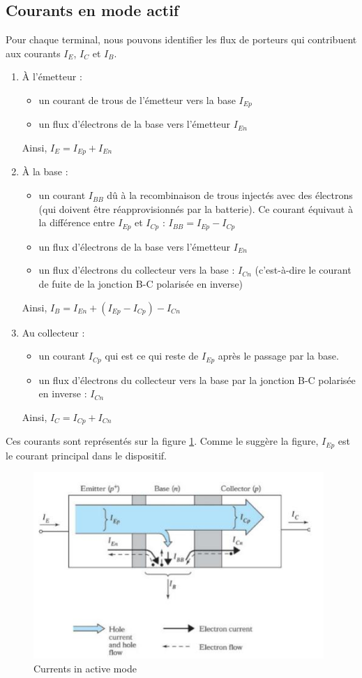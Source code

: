 \subsection{Courants en mode actif}
Pour chaque terminal, nous pouvons identifier les flux de porteurs qui contribuent aux courants $I_E$, $I_C$ et $I_B$.
\begin{enumerate}
	\item À l'émetteur :
	\begin{itemize}
		\item un courant de trous de l'émetteur vers la base $I_{Ep}$
		\item un flux d'électrons de la base vers l'émetteur $I_{En}$
	\end{itemize}
	Ainsi, $I_E = I_{Ep} + I_{En}$
	\item À la base :
	\begin{itemize}
		\item un courant $I_{BB}$ dû à la recombinaison de trous injectés avec des électrons (qui doivent être réapprovisionnés par la batterie). Ce courant équivaut à la différence entre $I_{Ep}$ et $I_{Cp}$ : $I_{BB} = I_{Ep} - I_{Cp}$
		\item un flux d'électrons de la base vers l'émetteur $I_{En}$
		\item un flux d'électrons du collecteur vers la base : $I_{Cn}$ (c'est-à-dire le courant de fuite de la jonction B-C polarisée en inverse)
	\end{itemize}
	Ainsi, $I_B = I_{En} + (I_{Ep} - I_{Cp}) - I_{Cn}$
	\item Au collecteur :
	\begin{itemize}
		\item un courant $I_{Cp}$ qui est ce qui reste de $I_{Ep}$ après le passage par la base.
		\item un flux d'électrons du collecteur vers la base par la jonction B-C polarisée en inverse : $I_{Cn}$
	\end{itemize}
	Ainsi, $I_C = I_{Cp} + I_{Cn}$
\end{enumerate}
Ces courants sont représentés sur la figure \ref{fig:bjt4}. Comme le suggère la figure, $I_{Ep}$ est le courant principal dans le dispositif.

\begin{figure}[h!]
\centering
\includegraphics[width=11cm]{figures/ch01/bjt4.jpg}
\caption{Currents in active mode} 
\label{fig:bjt4}
\end{figure}

